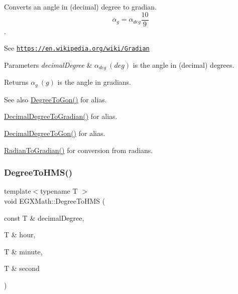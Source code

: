 Converts an angle in (decimal) degree to gradian. \[\alpha_{g}=\alpha_{deg}\frac{10}{9}\]. 

See \href{https://en.wikipedia.org/wiki/Gradian}{\tt https\+://en.\+wikipedia.\+org/wiki/\+Gradian} 
\begin{DoxyParams}{Parameters}
{\em decimal\+Degree} & $\alpha_{deg}\ (deg)$ is the angle in (decimal) degrees. \\
\hline
\end{DoxyParams}
\begin{DoxyReturn}{Returns}
$\alpha_{g}\ (g)$ is the angle in gradians. 
\end{DoxyReturn}
\begin{DoxySeeAlso}{See also}
\mbox{\hyperlink{group___e_g_x_math-_angle_conversions-_degree_ga87c3fab0867021e5d2501197b4db6194}{Degree\+To\+Gon()}} for alias. 

\mbox{\hyperlink{group___e_g_x_math-_angle_conversions-_decimal_degree_ga3ac6f1ceb36a4938cdf3b55554734c99}{Decimal\+Degree\+To\+Gradian()}} for alias. 

\mbox{\hyperlink{group___e_g_x_math-_angle_conversions-_decimal_degree_gaeb333a1ad0aeb913c025fbd1be85fcb3}{Decimal\+Degree\+To\+Gon()}} for alias. 

\mbox{\hyperlink{group___e_g_x_math-_angle_conversions-_radian_ga3c1607eae50cbf0186c42485bb3878d5}{Radian\+To\+Gradian()}} for conversion from radians. 
\end{DoxySeeAlso}
\mbox{\label{group___e_g_x_math-_angle_conversions-_degree_ga0bb223ca6e77b00439a6d910ab32d82e}} 
\subsubsection{\texorpdfstring{Degree\+To\+H\+M\+S()}{DegreeToHMS()}}
{\footnotesize\ttfamily template$<$typename T $>$ \\
void E\+G\+X\+Math\+::\+Degree\+To\+H\+MS (\begin{DoxyParamCaption}\item[{const T \&}]{decimal\+Degree,  }\item[{T \&}]{hour,  }\item[{T \&}]{minute,  }\item[{T \&}]{second }\end{DoxyParamCaption})}



